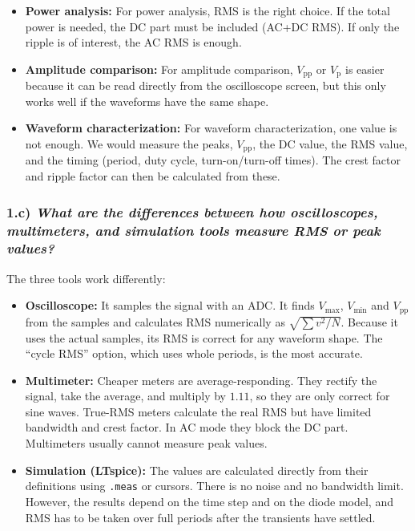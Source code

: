 \begin{itemize}
    \item \textbf{Power analysis:} For power analysis, RMS is the right choice. If the total power is needed, the DC part must be included (AC+DC RMS). If only the ripple is of interest, the AC RMS is enough.
    \item \textbf{Amplitude comparison:} For amplitude comparison, $V_{\mathrm{pp}}$ or $V_\mathrm{p}$ is easier because it can be read directly from the oscilloscope screen, but this only works well if the waveforms have the same shape.
    \item \textbf{Waveform characterization:} For waveform characterization, one value is not enough. We would measure the peaks, $V_{\mathrm{pp}}$, the DC value, the RMS value, and the timing (period, duty cycle, turn-on/turn-off times). The crest factor and ripple factor can then be calculated from these.
\end{itemize}

\subsubsection*{1.c) \normalfont\itshape What are the differences between how oscilloscopes, multimeters, and simulation tools measure RMS or peak values?}

The three tools work differently:
\begin{itemize}
    \item \textbf{Oscilloscope:} It samples the signal with an ADC. It finds $V_{\mathrm{max}}$, $V_{\mathrm{min}}$ and $V_{\mathrm{pp}}$ from the samples and calculates RMS numerically as $\sqrt{\sum v^2/N}$. Because it uses the actual samples, its RMS is correct for any waveform shape. The ``cycle RMS'' option, which uses whole periods, is the most accurate.
    \item \textbf{Multimeter:} Cheaper meters are average-responding. They rectify the signal, take the average, and multiply by $1.11$, so they are only correct for sine waves. True-RMS meters calculate the real RMS but have limited bandwidth and crest factor. In AC mode they block the DC part. Multimeters usually cannot measure peak values.
    \item \textbf{Simulation (LTspice):} The values are calculated directly from their definitions using \texttt{.meas} or cursors. There is no noise and no bandwidth limit. However, the results depend on the time step and on the diode model, and RMS has to be taken over full periods after the transients have settled.
\end{itemize}

